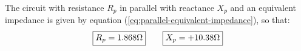 \documentclass{homework}
\begin{document}
The circuit with resistance $R_p$ in parallel with reactance $X_p$
and an equivalent impedance is given by
equation (\ref{eq:parallel-equivalent-impedance}), so that:
\begin{equation*}
    \boxed{R_p = 1.868 \ohm} \qquad \boxed{X_p = +10.38 \ohm}
\end{equation*}











\end{document}
